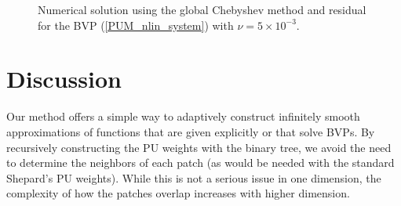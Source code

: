 \begin{figure}[!htb]
\centering
{}
\caption{Numerical solution using the global Chebyshev method and residual for the BVP (\ref{PUM_nlin_system}) with $\nu=5 \times 10^{-3}$.
}
\label{GNLIN_EXAMPLE}
\end{figure}

\section{Discussion}
Our method offers a simple way to adaptively construct infinitely smooth approximations of functions that are given explicitly or that solve BVPs. By recursively constructing the PU weights with the binary tree, we avoid the need to determine the neighbors of each patch (as would be needed with the standard Shepard's PU weights). While this is not a serious issue in one dimension, the complexity of how the patches overlap increases with higher dimension. 

